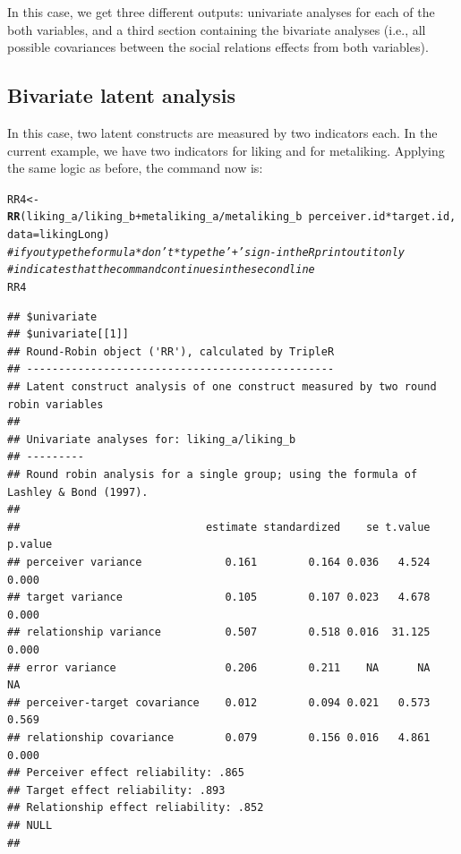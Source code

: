 \documentclass[a4paper]{article}\usepackage[]{graphicx}\usepackage[]{color}
\makeatletter
\newcommand{\hlcom}[1]{\textcolor[rgb]{0.678,0.584,0.686}{\textit{#1}}}%
\newcommand{\hlopt}[1]{\textcolor[rgb]{0,0,0}{#1}}%
\newcommand{\hlstd}[1]{\textcolor[rgb]{0.345,0.345,0.345}{#1}}%
\newcommand{\hlkwb}[1]{\textcolor[rgb]{0.69,0.353,0.396}{#1}}%
\newcommand{\hlkwc}[1]{\textcolor[rgb]{0.333,0.667,0.333}{#1}}%
\newcommand{\hlkwd}[1]{\textcolor[rgb]{0.737,0.353,0.396}{\textbf{#1}}}%
\newenvironment{kframe}{%
 \def\at@end@of@kframe{}%
 \ifinner\ifhmode%
  \def\at@end@of@kframe{\end{minipage}}%
  \begin{minipage}{\columnwidth}%
 \fi\fi%
 \def\FrameCommand##1{\hskip\@totalleftmargin \hskip-\fboxsep
 \colorbox{shadecolor}{##1}\hskip-\fboxsep
     \hskip-\linewidth \hskip-\@totalleftmargin \hskip\columnwidth}%
 \MakeFramed {\advance\hsize-\width
   \@totalleftmargin\z@ \linewidth\hsize
   \@setminipage}}%
 {\par\unskip\endMakeFramed%
 \at@end@of@kframe}
\newenvironment{knitrout}{}{} %
\makeatother
\begin{document}
In this case, we get three different outputs: univariate analyses for each of the both variables, and a third section containing the bivariate analyses (i.e., all possible covariances between the social relations effects from both variables).



\subsection{Bivariate latent analysis} %
\label{sub:bivariate_latent_analysis}
In this case, two latent constructs are measured by two indicators each. In the current example, we have two indicators for liking and for metaliking. Applying the same logic as before, the command now is:
\begin{knitrout}\small
{}\color{fgcolor}\begin{kframe}
\begin{alltt}
\hlstd{RR4} \hlkwb{<-} \hlkwd{RR}\hlstd{(liking_a}\hlopt{/}\hlstd{liking_b} \hlopt{+} \hlstd{metaliking_a}\hlopt{/}\hlstd{metaliking_b} \hlopt{~} \hlstd{perceiver.id} \hlopt{*} \hlstd{target.id,} \hlkwc{data} \hlstd{= likingLong)}
\hlcom{# if you type the formula *don't* type the '+' sign - in the R print out it only}
\hlcom{# indicates that the command continues in the second line}
\hlstd{RR4}
\end{alltt}
\begin{verbatim}
## $univariate
## $univariate[[1]]
## Round-Robin object ('RR'), calculated by TripleR
## ------------------------------------------------
## Latent construct analysis of one construct measured by two round robin variables
## 
## Univariate analyses for: liking_a/liking_b 
## ---------
## Round robin analysis for a single group; using the formula of Lashley & Bond (1997).
## 
##                             estimate standardized    se t.value p.value
## perceiver variance             0.161        0.164 0.036   4.524   0.000
## target variance                0.105        0.107 0.023   4.678   0.000
## relationship variance          0.507        0.518 0.016  31.125   0.000
## error variance                 0.206        0.211    NA      NA      NA
## perceiver-target covariance    0.012        0.094 0.021   0.573   0.569
## relationship covariance        0.079        0.156 0.016   4.861   0.000
## Perceiver effect reliability: .865 
## Target effect reliability: .893 
## Relationship effect reliability: .852 
## NULL
## 

\end{verbatim}
\end{kframe}
\end{knitrout}
\end{document}
